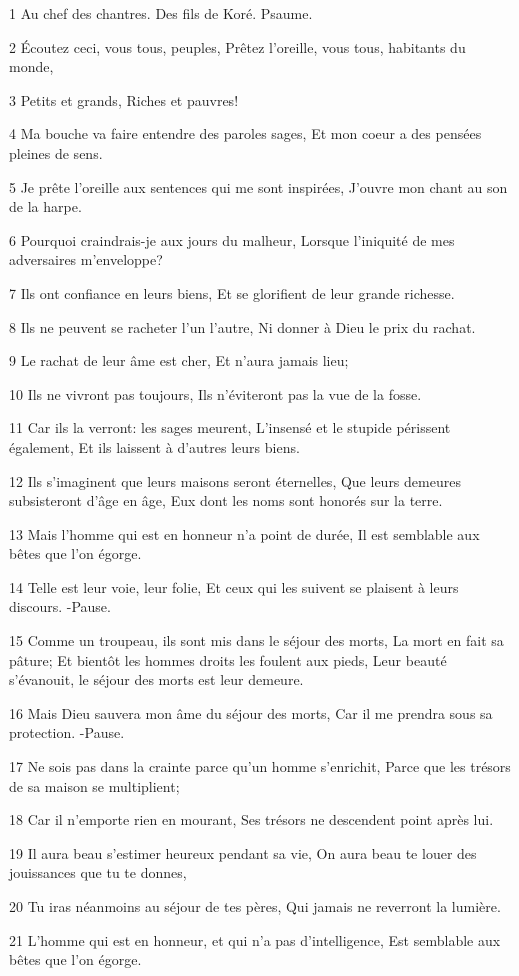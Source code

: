 \par 1 Au chef des chantres. Des fils de Koré. Psaume.
\par 2 Écoutez ceci, vous tous, peuples, Prêtez l'oreille, vous tous, habitants du monde,
\par 3 Petits et grands, Riches et pauvres!
\par 4 Ma bouche va faire entendre des paroles sages, Et mon coeur a des pensées pleines de sens.
\par 5 Je prête l'oreille aux sentences qui me sont inspirées, J'ouvre mon chant au son de la harpe.
\par 6 Pourquoi craindrais-je aux jours du malheur, Lorsque l'iniquité de mes adversaires m'enveloppe?
\par 7 Ils ont confiance en leurs biens, Et se glorifient de leur grande richesse.
\par 8 Ils ne peuvent se racheter l'un l'autre, Ni donner à Dieu le prix du rachat.
\par 9 Le rachat de leur âme est cher, Et n'aura jamais lieu;
\par 10 Ils ne vivront pas toujours, Ils n'éviteront pas la vue de la fosse.
\par 11 Car ils la verront: les sages meurent, L'insensé et le stupide périssent également, Et ils laissent à d'autres leurs biens.
\par 12 Ils s'imaginent que leurs maisons seront éternelles, Que leurs demeures subsisteront d'âge en âge, Eux dont les noms sont honorés sur la terre.
\par 13 Mais l'homme qui est en honneur n'a point de durée, Il est semblable aux bêtes que l'on égorge.
\par 14 Telle est leur voie, leur folie, Et ceux qui les suivent se plaisent à leurs discours. -Pause.
\par 15 Comme un troupeau, ils sont mis dans le séjour des morts, La mort en fait sa pâture; Et bientôt les hommes droits les foulent aux pieds, Leur beauté s'évanouit, le séjour des morts est leur demeure.
\par 16 Mais Dieu sauvera mon âme du séjour des morts, Car il me prendra sous sa protection. -Pause.
\par 17 Ne sois pas dans la crainte parce qu'un homme s'enrichit, Parce que les trésors de sa maison se multiplient;
\par 18 Car il n'emporte rien en mourant, Ses trésors ne descendent point après lui.
\par 19 Il aura beau s'estimer heureux pendant sa vie, On aura beau te louer des jouissances que tu te donnes,
\par 20 Tu iras néanmoins au séjour de tes pères, Qui jamais ne reverront la lumière.
\par 21 L'homme qui est en honneur, et qui n'a pas d'intelligence, Est semblable aux bêtes que l'on égorge.

